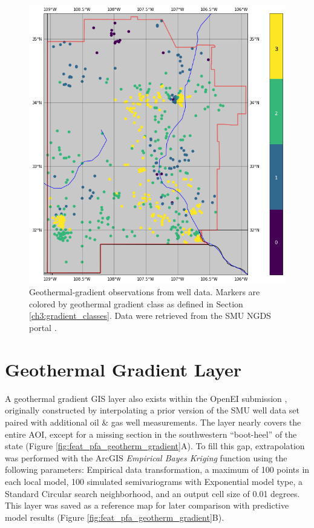 \begin{figure}[H]
\centering
\includegraphics[width=0.8\linewidth]{templates/images/GeothermGrad_input_wells_map-4classes_grid.png}
\caption[Geothermal gradient well data]{Geothermal-gradient observations from well data. Markers are colored by geothermal gradient class as defined in Section \ref{ch3:gradient_classes}. Data were retrieved from the SMU NGDS portal \protect\citep{smu_geothermal_2021}.}
\label{fig:feat_geotherm_gradient}
\end{figure}

\section{Geothermal Gradient Layer}\label{app:dl_geothermal_gradient}

A geothermal gradient GIS layer also exists within the \citeauthor{bielicki_hydrogeolgic_2015} OpenEI submission \citep{kelley_geothermal_2015}, originally constructed by interpolating a prior version of the SMU well data set paired with additional oil \& gas well measurements. The layer nearly covers the entire AOI, except for a missing section in the southwestern ``boot-heel'' of the state (Figure \ref{fig:feat_pfa_geotherm_gradient}A). To fill this gap, extrapolation was performed with the ArcGIS \textit{Empirical Bayes Kriging} function using the following parameters: Empirical data transformation, a maximum of 100 points in each local model, 100 simulated semivariograms with Exponential model type, a Standard Circular search neighborhood, and an output cell size of 0.01 degrees. This layer was saved as a reference map for later comparison with predictive model results (Figure \ref{fig:feat_pfa_geotherm_gradient}B).  

